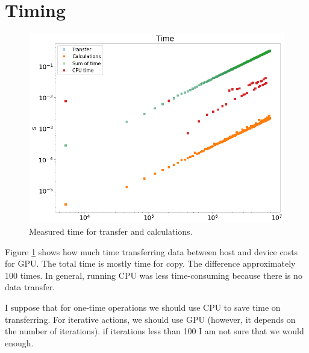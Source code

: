 \documentclass{article}
\begin{document}
 \section{Timing}
 \begin{figure}[h]
 	\centering
	\includegraphics[scale=0.37]{time.png}  
	\caption{ Measured time for transfer and calculations.  }
	\label{time}
\end{figure}
Figure \ref{time} shows how much time transferring data between host and device costs for GPU. The total time is mostly time for copy. The difference approximately 100 times. In general, running CPU was less time-consuming because there is no data transfer. 

I suppose that for one-time operations we should use CPU to save time on transferring. For iterative actions, we should use GPU (however, it depends on the number of iterations). if iterations less than 100 I am not sure that we would enough. 
\end{document}
